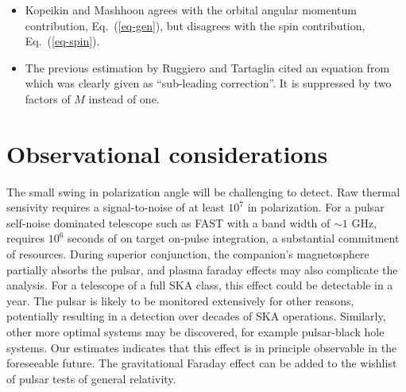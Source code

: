 \documentclass[aps,showpacs,onecolumn,floats,prd,superscriptaddress,nofootinbib]{revtex4}
\begin{document}
\begin{itemize}
\item Kopeikin and Mashhoon \cite{KopMas01} agrees with the orbital angular momentum contribution, Eq.~(\ref{eq-gen}), but disagrees with the spin contribution, Eq.~(\ref{eq-spin}).
\item The previous estimation by Ruggiero and Tartaglia \cite{RugTar06} cited an equation from \cite{Ser04} which was clearly given as ``sub-leading correction''. It is suppressed by two factors of $M$ instead of one.
\end{itemize}

\section{Observational considerations}

The small swing in polarization angle will be challenging to detect.
Raw thermal sensivity requires a signal-to-noise of at least $10^7$ in
polarization.  For a pulsar self-noise dominated telescope such as
FAST with a band width of $\sim 1$ GHz, requires $10^6$ seconds of on
target on-pulse integration, a substantial commitment of resources.
During superior conjunction, the companion's magnetosphere partially
absorbs the pulsar, and plasma faraday effects may also complicate the
analysis.  For a telescope of a full SKA class, this effect could be
detectable in a year.  The pulsar is likely to be monitored extensively
for other reasons, potentially resulting in a detection over decades
of SKA operations.  Similarly, other more optimal systems may be
discovered, for example pulsar-black hole systems.  Our estimates
indicates that this effect is in principle observable in the
foreseeable future.  The gravitational Faraday effect can be added to
the wishlist of pulsar tests of general relativity.


\end{document}
